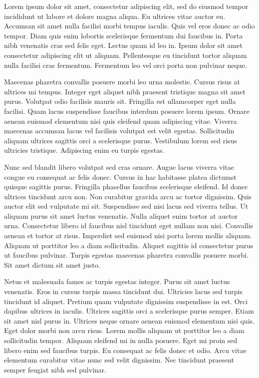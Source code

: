 Lorem\cite{perrySituSerialLaue2014} ipsum dolor sit amet, consectetur adipiscing elit, sed do eiusmod tempor
incididunt ut labore et dolore magna aliqua. Eu ultrices vitae auctor eu.
Accumsan sit amet nulla facilisi morbi tempus iaculis. Quis vel eros donec ac
odio tempor. Diam quis enim lobortis scelerisque fermentum dui faucibus in.
Porta nibh venenatis cras sed felis eget. Lectus quam id leo in. Ipsum dolor sit
amet consectetur adipiscing elit ut aliquam. Pellentesque eu tincidunt tortor
aliquam nulla facilisi cras fermentum. Fermentum leo vel orci porta non pulvinar
neque.

Maecenas pharetra convallis posuere morbi leo urna molestie. Cursus risus at
ultrices mi tempus. Integer eget aliquet nibh praesent tristique magna sit amet
purus. Volutpat odio facilisis mauris sit. Fringilla est ullamcorper eget nulla
facilisi. Quam lacus suspendisse faucibus interdum posuere lorem ipsum. Ornare
aenean euismod elementum nisi quis eleifend quam adipiscing vitae. Viverra
maecenas accumsan lacus vel facilisis volutpat est velit egestas. Sollicitudin
aliquam ultrices sagittis orci a scelerisque purus. Vestibulum lorem sed risus
ultricies tristique. Adipiscing enim eu turpis egestas.

Nunc sed blandit libero volutpat sed cras ornare. Augue lacus viverra vitae
congue eu consequat ac felis donec. Cursus in hac habitasse platea dictumst
quisque sagittis purus. Fringilla phasellus faucibus scelerisque eleifend. Id
donec ultrices tincidunt arcu non. Non curabitur gravida arcu ac tortor
dignissim. Quis auctor elit sed vulputate mi sit. Suspendisse sed nisi lacus sed
viverra tellus. Ut aliquam purus sit amet luctus venenatis. Nulla aliquet enim
tortor at auctor urna. Consectetur libero id faucibus nisl tincidunt eget nullam
non nisi. Convallis aenean et tortor at risus. Imperdiet sed euismod nisi porta
lorem mollis aliquam. Aliquam ut porttitor leo a diam sollicitudin. Aliquet
sagittis id consectetur purus ut faucibus pulvinar. Turpis egestas maecenas
pharetra convallis posuere morbi. Sit amet dictum sit amet justo.

Netus et malesuada fames ac turpis egestas integer. Purus sit amet luctus
venenatis. Eros in cursus turpis massa tincidunt dui. Ultricies lacus sed turpis
tincidunt id aliquet. Pretium quam vulputate dignissim suspendisse in est. Orci
dapibus ultrices in iaculis. Ultrices sagittis orci a scelerisque purus semper.
Etiam sit amet nisl purus in. Ultrices neque ornare aenean euismod elementum
nisi quis. Eget dolor morbi non arcu risus. Lorem mollis aliquam ut porttitor
leo a diam sollicitudin tempor. Aliquam eleifend mi in nulla posuere. Eget mi
proin sed libero enim sed faucibus turpis. Eu consequat ac felis donec et odio.
Arcu vitae elementum curabitur vitae nunc sed velit dignissim. Nec tincidunt
praesent semper feugiat nibh sed pulvinar.

